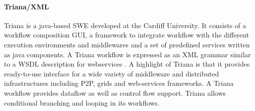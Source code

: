 \paragraph{Triana/XML} Triana \cite{taylor-shields-etal:2003} is a java-based
SWE developed at the Cardiff University. It consists of a workflow composition
GUI, a framework to integrate workflow with the different execution
environments and middlewares and a set of predefined services written as java
components. A Triana workflow is expressed as an XML grammar similar to a WSDL
description for webservices \cite{taylor-wand-etal:2005}. A highlight of
Triana is that it provides ready-to-use interface for a wide variety of
middleware and distributed infrastructures including P2P, grids and
web-services frameworks. A Triana workflow provides dataflow as well as control
flow support. Triana allows conditional branching and looping in its workflows.
